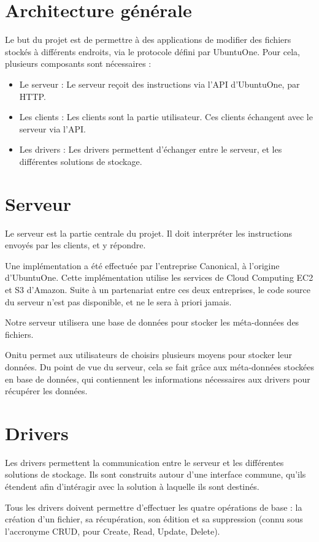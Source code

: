 \section{Architecture générale}
Le but du projet est de permettre à des applications de modifier des fichiers stockés à différents endroits, via le protocole défini par UbuntuOne.
Pour cela, plusieurs composants sont nécessaires :
\begin{itemize} 
   \item Le serveur : Le serveur reçoit des instructions via l'API d'UbuntuOne, par HTTP.
   \item Les clients : Les clients sont la partie utilisateur. Ces clients échangent avec le serveur via l'API. 
   \item Les drivers : Les drivers permettent d'échanger entre le serveur, et les différentes solutions de stockage. 
\end{itemize}

\section{Serveur}
Le serveur est la partie centrale du projet. Il doit interpréter les instructions envoyés par les clients, et y répondre.

Une implémentation a été effectuée par l'entreprise Canonical, à l'origine d'UbuntuOne. Cette implémentation utilise les services de Cloud Computing EC2 et S3 d'Amazon. Suite à un partenariat entre ces deux entreprises, le code source du serveur n'est pas disponible, et ne le sera à priori jamais.

Notre serveur utilisera une base de données pour stocker les méta-données des fichiers.

Onitu permet aux utilisateurs de choisirs plusieurs moyens pour stocker leur données. Du point de vue du serveur, cela se fait grâce aux méta-données stockées en base de données, qui contiennent les informations nécessaires aux drivers pour récupérer les données. 

\section{Drivers}
Les drivers permettent la communication entre le serveur et les différentes solutions de stockage. Ils sont construits autour d'une interface commune, qu'ils étendent afin d'intéragir avec la solution à laquelle ils sont destinés.

Tous les drivers doivent permettre d'effectuer les quatre opérations de base : la création d'un fichier, sa récupération, son édition et sa suppression (connu sous l'accronyme CRUD, pour Create, Read, Update, Delete).

